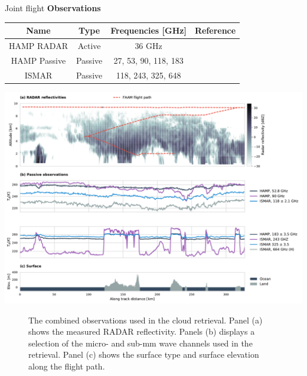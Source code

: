 \documentclass[final,hyperref={pdfpagelabels=false}]{beamer}
\begin{document}
\begin{frame}
\begin{columns}[t]
\begin{column}{.48\linewidth}
\begin{block}{Joint flight}
           \textbf{Observations}

           \vspace{1cm}
           \centering
          \begin{tabular}{|c|c|c|c|}
            \hline
            Name & Type & Frequencies [GHz]& Reference \\
            \hline
            \hline
            HAMP RADAR & Active  & 36 GHz & \cite{hamp} \\
            \hline
            HAMP Passive & Passive  & 27,  53, 90, 118, 183 & \cite{hamp} \\
            \hline
            ISMAR & Passive  & 118, 243, 325, 648 & \cite{hamp} \\
            \hline
          \end{tabular}
           \vspace{1cm}

            \includegraphics[width=1.0\textwidth]{../plots/observations_combined}
            \begin{figure}
            \centering
            \caption{The combined observations used in the cloud retrieval. Panel (a) shows
              the measured RADAR reflectivity. Panels (b) displays a selection of the micro-
              and sub-mm wave channels used in the retrieval. Panel (c) shows the surface
              type and surface elevation along the flight path.}
            \end{figure}
        \end{block}

          

\end{column}
\end{columns}
\end{frame}
\end{document}
